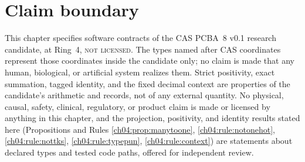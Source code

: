\section{Claim boundary}\label{ch04:sec:boundary}

\begin{boundary}\label{ch04:bnd:main}
This chapter specifies software contracts of the CAS PCBA~8 v0.1 research
candidate, at Ring~4, \textsc{not licensed}. The types named after CAS
coordinates represent those coordinates inside the candidate only; no
claim is made that any human, biological, or artificial system realizes
them. Strict positivity, exact summation, tagged identity, and the fixed
decimal context are properties of the candidate's arithmetic and records,
not of any external quantity. No physical, causal, safety, clinical,
regulatory, or product claim is made or licensed by anything in this
chapter, and the projection, positivity, and identity results stated here
(Propositions and Rules \ref{ch04:prop:manytoone},
\ref{ch04:rule:notonehot}, \ref{ch04:rule:nottks},
\ref{ch04:rule:typepun}, \ref{ch04:rule:context}) are statements about
declared types and tested code paths, offered for independent review.
\end{boundary}
